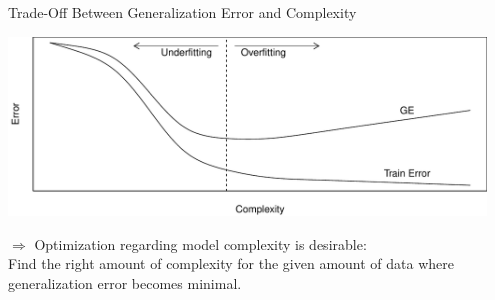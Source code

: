 \documentclass[11pt,compress,t,notes=noshow, xcolor=table]{beamer}
\newenvironment{knitrout}{}{} %
\begin{document}
\begin{vbframe}{Trade-Off Between Generalization Error and Complexity}


\lz
\begin{knitrout}\scriptsize
{}\color{fgcolor}

{\centering \includegraphics[width=0.95\textwidth]{figure/eval_ofit_3} 

}



\end{knitrout}

\lz
$\Rightarrow$ Optimization regarding model complexity is desirable:\\ 
Find the right amount of complexity for the given amount of data where generalization error becomes minimal.

\end{vbframe}

\endlecture
\end{document}

